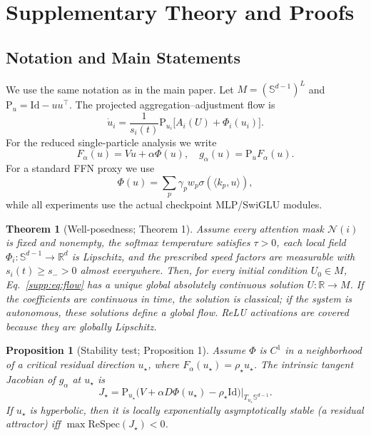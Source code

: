 \documentclass[11pt]{article}
\newtheorem{theorem}{Theorem}
\newtheorem{proposition}{Proposition}
\newcommand{\R}{\mathbb{R}}
\newcommand{\Sph}{\mathbb{S}}
\newcommand{\Proj}{\mathrm{P}}
\newcommand{\Spec}{\mathrm{Spec}}
\newcommand{\RePart}{\mathrm{Re}}
\newcommand{\id}{\mathrm{Id}}
\begin{document}
\clearpage
\appendix

\section{Supplementary Theory and Proofs}\label{app:theory-proofs}

\subsection{Notation and Main Statements}
We use the same notation as in the main paper.  Let $M=(\Sph^{d-1})^L$ and
$\Proj_u=\id-uu^\top$.  The projected aggregation--adjustment flow is
\begin{equation}
\dot u_i=\frac{1}{s_i(t)}\Proj_{u_i}\big[A_i(U)+\Phi_i(u_i)\big].
\label{supp:eq:flow}
\end{equation}
For the reduced single-particle analysis we write
\begin{equation}
F_\alpha(u)=Vu+\alpha\Phi(u),\quad
 g_\alpha(u)=\Proj_uF_\alpha(u).
\label{supp:eq:single}
\end{equation}
For a standard FFN proxy we use
\begin{equation}
\Phi(u)=\sum_p \gamma_p w_p\sigma(\langle k_p,u\rangle),
\label{supp:eq:phi}
\end{equation}
while all experiments use the actual checkpoint MLP/SwiGLU modules.

\begin{theorem}[Well-posedness; Theorem 1]\label{supp:thm:wp}
Assume every attention mask $\mathcal N(i)$ is fixed and nonempty, the softmax
temperature satisfies $\tau>0$, each local field
$\Phi_i:\Sph^{d-1}\to\R^d$ is Lipschitz, and the prescribed speed factors are
measurable with $s_i(t)\ge s_->0$ almost everywhere. Then, for every initial
condition $U_0\in M$, Eq.~\eqref{supp:eq:flow} has a unique global absolutely
continuous solution $U:\R\to M$. If the coefficients are continuous in time,
the solution is classical; if the system is autonomous, these solutions define
a global flow. ReLU activations are covered because they are globally Lipschitz.
\end{theorem}

\begin{proposition}[Stability test; Proposition 1]\label{supp:prop:stab}
Assume $\Phi$ is $C^1$ in a neighborhood of a critical residual direction
$u_\star$, where $F_\alpha(u_\star)=\rho_\star u_\star$. The intrinsic tangent
Jacobian of $g_\alpha$ at $u_\star$ is
\begin{equation}
J_\star=\Proj_{u_\star}\big(V+\alpha D\Phi(u_\star)-\rho_\star\id\big)
\big|_{T_{u_\star}\Sph^{d-1}}.
\label{supp:eq:jac}
\end{equation}
If $u_\star$ is hyperbolic, then it is locally exponentially asymptotically
stable (a residual attractor) iff $\max\RePart\Spec(J_\star)<0$.
\end{proposition}
\end{document}
